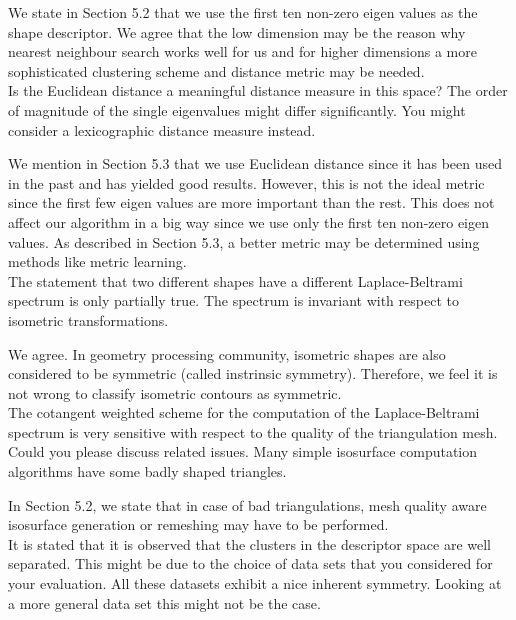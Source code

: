 \documentclass[10pt]{article}
\begin{document}
   {\color{blue}We state in Section 5.2 that we use the first ten non-zero eigen
	   values as the shape descriptor. We agree that the low dimension
	   may be the reason why
	   nearest neighbour search works well for us 
	   and for higher dimensions a more sophisticated clustering
   scheme and distance metric may be needed.}\\

   Is the Euclidean distance a meaningful distance measure in this space?
   The order of magnitude of the single eigenvalues might differ
   significantly. You might consider a lexicographic distance measure
   instead.

   {\color{blue}We mention in Section 5.3 that we use Euclidean distance
	   since it has been used in the past and has yielded good results.
	   However, this is not the ideal metric since the first few eigen
	   values are more important than the rest. This does not affect our
	   algorithm in a big way since we use only the first ten non-zero
	   eigen values. As described in Section 5.3, a better metric may
   be determined using methods like metric learning.}\\

   The statement that two different shapes have a different
   Laplace-Beltrami spectrum is only partially true. The spectrum is
   invariant with respect to isometric transformations.  

   {\color{blue} We agree. In geometry processing community,
	   isometric shapes are also considered to be symmetric (called instrinsic symmetry).
   Therefore, we feel it is not wrong to classify isometric contours as symmetric.}\\

   The cotangent weighted scheme for the computation of the
   Laplace-Beltrami spectrum is very sensitive with respect to the quality
   of the triangulation mesh. Could you please discuss related issues. Many
   simple isosurface computation algorithms have some badly shaped
   triangles.

   {\color{blue}In Section 5.2, we state that in case of bad triangulations,
	   mesh quality aware isosurface generation or remeshing may have to
   be performed.}\\


   It is stated that it is observed that the clusters in the descriptor
   space are well separated. This might be due to the choice of data sets
   that you considered for your evaluation. All these datasets exhibit a
   nice inherent symmetry. Looking at a more general data set this might not
   be the case.
\end{document}
